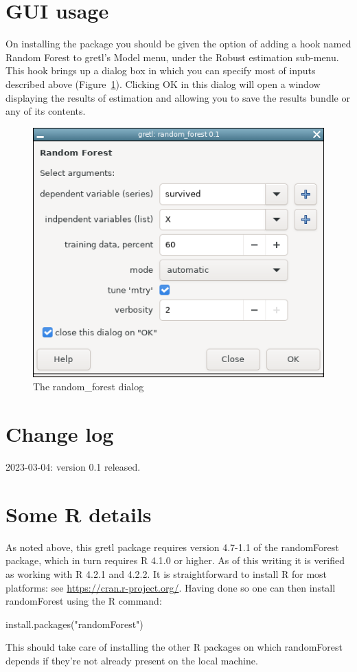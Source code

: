 \documentclass{article}
\begin{document}
\section{GUI usage}

On installing the package you should be given the option of adding a
hook named \textsf{Random Forest} to gretl's \textsf{Model} menu,
under the \textsf{Robust estimation} sub-menu. This hook brings up a
dialog box in which you can specify most of inputs described above
(Figure~\ref{fig:dialog}). Clicking \textsf{OK} in this dialog will
open a window displaying the results of estimation and allowing you to
save the results bundle or any of its contents.

\begin{figure}[htbp]
  \centering
  \includegraphics[scale=0.6]{rfgui.png}
  \caption{The random\_forest dialog}
  \label{fig:dialog}
\end{figure}

\section{Change log}

2023-03-04: version 0.1 released.

\section{Some \textsf{R} details}
\label{sec:Rdetails}

As noted above, this gretl package requires version 4.7-1.1 of the
\textsf{randomForest} package, which in turn requires \textsf{R} 4.1.0
or higher. As of this writing it is verified as working with
\textsf{R} 4.2.1 and 4.2.2. It is straightforward to install
\textsf{R} for most platforms: see
\url{https://cran.r-project.org/}. Having done so one can then install
\textsf{randomForest} using the \textsf{R} command:
\begin{code}
install.packages("randomForest")
\end{code}
This should take care of installing the other \textsf{R} packages on
which \textsf{randomForest} depends if they're not already present on
the local machine.
\end{document}
